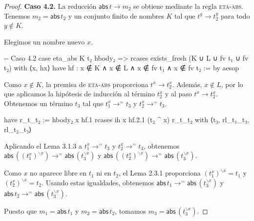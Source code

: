 \documentclass[
  spanish,
  letterpaper,
  DIV=11,
  numbers=noendperiod]{scrreprt}
\newenvironment{Shaded}{\begin{snugshade}}{\end{snugshade}}
\newcommand{\CommentTok}[1]{\textcolor[rgb]{0.37,0.37,0.37}{#1}}
\newcommand{\KeywordTok}[1]{\textcolor[rgb]{0.00,0.23,0.31}{\textbf{#1}}}
\newcommand{\NormalTok}[1]{\textcolor[rgb]{0.00,0.23,0.31}{#1}}
\renewcommand{\NormalTok}[1]{\textcolor[HTML]{000000}{#1}}
\renewcommand{\KeywordTok}[1]{\textcolor[HTML]{0000FF}{#1}}
\renewcommand{\CommentTok}[1]{\textcolor[HTML]{008000}{#1}}
\let\oldgreater\textgreater
\renewcommand{\textgreater}{\null\oldgreater}%
\theoremstyle{remark}
\begin{document}
\begin{proof}
\textbf{Caso 4.2.} La reducción \(\mathsf{abs} \, t\longrightarrow m_2\)
se obtiene mediante la regla \textsc{eta-abs}. Tenemos
\(m_2=\mathsf{abs} \, t_2\) y un conjunto finito de nombres \(K\) tal
que \(t^y\longrightarrow t_2^y\) para todo \(y\notin K\).

Elegimos un nombre nuevo \(x\).

\begin{Shaded}
\begin{Highlighting}[]
    \CommentTok{{-}{-} Caso 4.2}
\NormalTok{    case eta\_abs K t₂ hbody₂ =\textgreater{}}
\NormalTok{      rcases exists\_fresh (K ∪ L ∪ fv t₁ ∪ fv t₂) }\KeywordTok{with}\NormalTok{ ⟨x, hx⟩}
      \KeywordTok{have}\NormalTok{ hf : x ∉ K ∧ x ∉ L ∧ x ∉ fv t₁ ∧ x ∉ fv t₂ := }\KeywordTok{by}
\NormalTok{        aesop}
\end{Highlighting}
\end{Shaded}

Como \(x\notin K\), la premisa de \textsc{eta-abs} proporciona
\(t^x\longrightarrow t_2^x\). Además, \(x\notin L\), por lo que
aplicamos la hipótesis de inducción al término \(t_2^x\) y al paso
\(t^x\longrightarrow t_2^x\). Obtenemos un término \(t_3\) tal que
\(t_1^x\longrightarrow^{=}t_3\) y \(t_2^x\longrightarrow^{=}t_3\).

\begin{Shaded}
\begin{Highlighting}[]
      \KeywordTok{have}\NormalTok{ r\_t\_t₂ := hbody₂ x hf.1}
\NormalTok{      rcases ih x hf.2.1 (t₂ \^{} x) r\_t\_t₂ }\KeywordTok{with}\NormalTok{ ⟨t₃, rl\_t₁\_t₃, rl\_t₂\_t₃⟩}
\end{Highlighting}
\end{Shaded}

Aplicando el Lema 3.1.3 a \(t_1^x\longrightarrow^{=}t_3\) y
\(t_2^x\longrightarrow^{=}t_3\), obtenemos
\(\mathsf{abs}\,((t_1^x)^{\backslash x})
\longrightarrow^{=}
\mathsf{abs}\,(t_3^{\backslash x})\) y
\(\mathsf{abs}\,((t_2^x)^{\backslash x})
\longrightarrow^{=}
\mathsf{abs}\,(t_3^{\backslash x})\).

Como \(x\) no aparece libre en \(t_1\) ni en \(t_2\), el Lema 2.3.1
proporciona \((t_1^x)^{\backslash x}=t_1\) y
\((t_2^x)^{\backslash x}=t_2\). Usando estas igualdades, obtenemos
\(\mathsf{abs}\,t_1
\longrightarrow^{=}
\mathsf{abs}\,(t_3^{\backslash x})\) y \(\mathsf{abs}\,t_2
\longrightarrow^{=}
\mathsf{abs}\,(t_3^{\backslash x})\).

Puesto que \(m_1=\mathsf{abs} \, t_1\) y \(m_2=\mathsf{abs} \, t_2\),
tomamos \(m_3=\mathsf{abs} \, (t_3^{\backslash x})\).


\end{proof}
\end{document}
